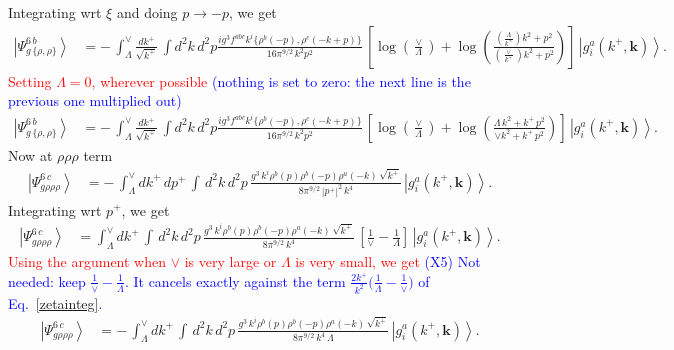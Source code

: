 \documentclass[10pt]{article}
\numberwithin{equation}{section}
\begin{document}
Integrating wrt $\xi$ and doing $p\rightarrow -p$, we get
\begin{align}
    \left|\Psi_{g\,\{\rho,\rho\}}^{6\, b}\right\rangle & =-\,\int_{\Lambda}^{\vee} \frac{dk^{+}}{\sqrt{k^{+}}}\, \int d^{2}k \, d^{2}p \frac{ig^{3}f^{abc}k^{i}\{\rho^{b}(-p),\rho^{c}(-k+p)\}}{16\pi^{9/2}\,k^{2}p^{2}}\,\left[\log{\left(\frac{\vee}{\Lambda}\right)}+\log{\left(\frac{\left(\frac{\Lambda}{k^{+}}\right) k^{2}+p^{2}}{\left(\frac{\vee}{k^{+}} \right)k^{2}+p^{2}}\right)}\right]\,\left|g_{i}^{a}(k^{+},\mathbf{k})\right\rangle.
\end{align}
\textcolor{red}{Setting $\Lambda = 0$, wherever possible} \textcolor{blue}{(nothing is set to zero: the next line is the previous one multiplied out)} 
\begin{align}\label{tworhoafter}
    \left|\Psi_{g\,\{\rho,\rho\}}^{6\, b}\right\rangle & =-\,\int_{\Lambda}^{\vee} \frac{dk^{+}}{\sqrt{k^{+}}}\, \int d^{2}k \, d^{2}p \frac{ig^{3}f^{abc}k^{i}\{\rho^{b}(-p),\rho^{c}(-k+p)\}}{16\pi^{9/2}\,k^{2}p^{2}}\,\left[\log{\left(\frac{\vee}{\Lambda}\right)}+\log{\left(\frac{\Lambda\, k^{2} + k^{+}\,p^{2}}{\vee k^{2}+k^{+}\,p^{2}}\right)}\right]\,\left|g_{i}^{a}(k^{+},\mathbf{k})\right\rangle.
\end{align}
Now at $\rho\rho\rho$ term
\begin{align}
    \left|\Psi_{g\rho\rho\rho}^{6\, c}\right\rangle & = -\, \int_{\Lambda}^{\vee} dk^{+}\, dp^{+}\, \int\, d^{2}k\, d^{2}p\, \frac{g^{3}\, k^{i}\rho^{b}(p)\rho^{b}(-p)\rho^{a}(-k)\,\sqrt{k^{+}}}{8\pi^{9/2}\,|p^{+}|^{2}\,k^{4}}\,\left|g_{i}^{a}(k^{+},\mathbf{k})\right\rangle. 
\end{align}
Integrating wrt $p^{+}$, we get
\begin{align}
    \left|\Psi_{g\rho\rho\rho}^{6\, c}\right\rangle & = \int_{\Lambda}^{\vee} dk^{+}\, \int\, d^{2}k\, d^{2}p\, \frac{g^{3}\, k^{i}\rho^{b}(p)\rho^{b}(-p)\rho^{a}(-k)\,\sqrt{k^{+}}}{8\pi^{9/2}\,k^{4}}\, \left[\frac{1}{\vee}-\frac{1}{\Lambda}\right]\,\left|g_{i}^{a}(k^{+},\mathbf{k})\right\rangle.
\end{align}
\textcolor{red}{Using the argument when $\vee$ is very large or $\Lambda$ is very small, we get} \textcolor{blue}{(X5) Not needed: keep $\frac{1}{\vee}-\frac{1}{\Lambda}$. It cancels exactly against the term $\frac{2k^{+}}{k^{2}}\big(\frac1\Lambda-\frac1\vee\big)$ of Eq.~\eqref{zetainteg}.}
\begin{align}\label{threerhoafter}
        \left|\Psi_{g\rho\rho\rho}^{6\, c}\right\rangle & = -\,\int_{\Lambda}^{\vee} dk^{+}\, \int\, d^{2}k\, d^{2}p\, \frac{g^{3}\, k^{i}\rho^{b}(p)\rho^{b}(-p)\rho^{a}(-k)\,\sqrt{k^{+}}}{8\pi^{9/2}\,k^{4}\, \Lambda}\,\left|g_{i}^{a}(k^{+},\mathbf{k})\right\rangle.
\end{align}
\end{document}
